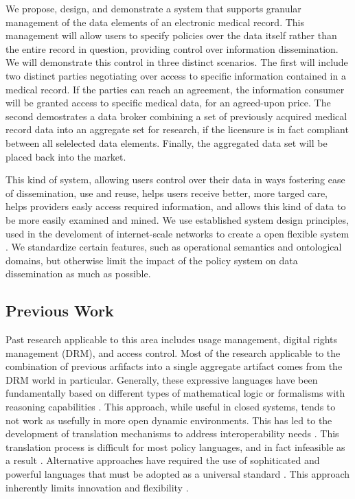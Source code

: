 \documentclass[10pt, conference, compsocconf]{IEEEtran}
\begin{document}
We propose, design, and demonstrate a system that supports granular management of the data elements of an electronic medical record.  This management will allow users to specify policies over the data itself rather than the entire record in question, providing control over information dissemination.  We will demonstrate this control in three distinct scenarios.  The first will include two distinct parties negotiating over access to specific information contained in a medical record.  If the parties can reach an agreement, the information consumer will be granted access to specific medical data, for an agreed-upon price.  The second demostrates a data broker combining a set of previously acquired medical record data into an aggregate set for research, if the licensure is in fact compliant between all selelected data elements.  Finally, the aggregated data set will be placed back into the market.

This kind of system, allowing users control over their data in ways fostering ease of dissemination, use and reuse, helps users receive better, more targed care, helps providers easly access required information, and allows this kind of data to be more easily examined and mined.  We use established system design principles, used in the develoment of internet-scale networks to create a open flexible system \cite{Al:04,BlCl:01,ClWrSoBr:02}.  We standardize certain features, such as operational semantics and ontological domains, but otherwise limit the impact of the policy system on data dissemination as much as possible.


\subsection{Previous Work}
Past research applicable to this area includes usage management, digital rights management (DRM), and access control.  Most of the research applicable to the combination of previous arfifacts into a single aggregate artifact comes from the DRM world in particular.  Generally, these expressive languages have been fundamentally based on different types of mathematical logic or formalisms with reasoning capabilities \cite{ArHu:07,BaMi:06,ChCoEtHaJoLa:03,HaWe:04,HaWe:08,PuWe:02,XiBjFu:08}.  This approach, while useful in closed systems, tends to not work as usefully in more open dynamic environments.  This has led to the development of translation mechanisms to address interoperability needs \cite{HeJa:05,PoPrDe:04,ScTaWo:04}.  This translation process is difficult for most policy languages, and in fact infeasible as a result \cite{KoLaMaMi:04,SaShUe:04}.  Alternative approaches have required the use of sophiticated and powerful languages that must be adopted as a universal standard \cite{OMADRM,ODRL-req,Wa:04,XrML-spec}.  This approach inherently limits innovation and flexibility \cite{HeJa:05,JaHe:04,JaHe:08,JaHeMa:06}.
\end{document}
